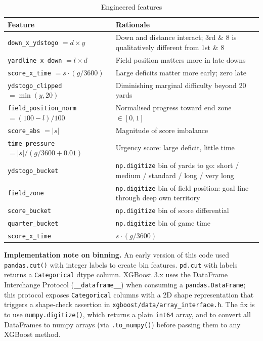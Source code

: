 \documentclass[11pt]{article}
\begin{document}
\begin{table}[H]
\centering
\caption{Engineered features}
\begin{tabular}{lp{9cm}}
\toprule
Feature & Rationale \\
\midrule
\texttt{down\_x\_ydstogo} $= d \times y$ & Down and distance interact; 3rd \& 8 is qualitatively different from 1st \& 8 \\
\texttt{yardline\_x\_down} $= l \times d$ & Field position matters more in late downs \\
\texttt{score\_x\_time} $= s \cdot (g/3600)$ & Large deficits matter more early; zero late \\
\texttt{ydstogo\_clipped} $= \min(y, 20)$ & Diminishing marginal difficulty beyond 20 yards \\
\texttt{field\_position\_norm} $= (100 - l)/100$ & Normalised progress toward end zone $\in [0,1]$ \\
\texttt{score\_abs} $= |s|$ & Magnitude of score imbalance \\
\texttt{time\_pressure} $= |s| / (g/3600 + 0.01)$ & Urgency score: large deficit, little time \\
\texttt{ydstogo\_bucket} & \texttt{np.digitize} bin of yards to go: short / medium / standard / long / very long \\
\texttt{field\_zone} & \texttt{np.digitize} bin of field position: goal line through deep own territory \\
\texttt{score\_bucket} & \texttt{np.digitize} bin of score differential \\
\texttt{quarter\_bucket} & \texttt{np.digitize} bin of game time \\
\texttt{score\_x\_time} & $s \cdot (g / 3600)$ \\
\bottomrule
\end{tabular}
\end{table}

\textbf{Implementation note on binning.} An early version of this code used
\texttt{pandas.cut()} with integer labels to create bin features.
\texttt{pd.cut} with labels returns a \texttt{Categorical} dtype column.
XGBoost 3.x uses the DataFrame Interchange Protocol (\texttt{\_\_dataframe\_\_})
when consuming a \texttt{pandas.DataFrame}; this protocol exposes
\texttt{Categorical} columns with a 2D shape representation that triggers
a shape-check assertion in \texttt{xgboost/data/array\_interface.h}.
The fix is to use \texttt{numpy.digitize()}, which returns a plain
\texttt{int64} array, and to convert all DataFrames to numpy arrays
(via \texttt{.to\_numpy()}) before passing them to any XGBoost method.
\end{document}
